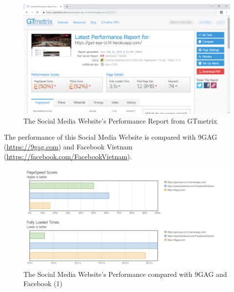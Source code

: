 \begin{center}
    \begin{figure}[H]
    \centering
    \includegraphics[width=1\columnwidth]{images/chap5/gtmetrix-result.PNG}
    \caption{The Social Media Website's Performance Report from GTmetrix}
    \end{figure}
\end{center}

The performance of this Social Media Website is compared with 9GAG (\href{https://9gag.com}{https://9gag.com}) and Facebook  Vietnam (\href{https://facebook.com/FacebookVietnam}{https://facebook.com/FacebookVietnam}).

\begin{center}
    \begin{figure}[H]
    \centering
    \includegraphics[width=1\columnwidth]{images/chap5/gtmetrix-graph-1.PNG}
    \caption{The Social Media Website's Performance compared with 9GAG and Facebook (1)}
    \end{figure}
\end{center}

